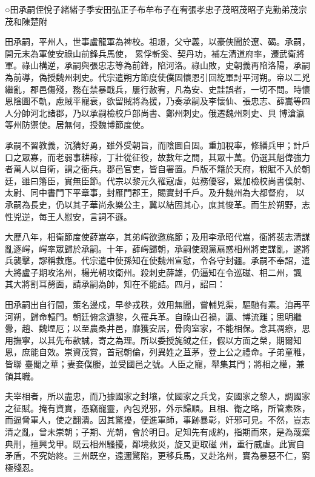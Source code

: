 
\begin{pinyinscope}

 ○田承嗣侄悅子緒緒子季安田弘正子布牟布子在宥張孝忠子茂昭茂昭子克勤弟茂宗茂和陳楚附



 田承嗣，平州人，世事盧龍軍為裨校。祖璟，父守義，以豪俠聞於遼、碣。承嗣，開元末為軍使安祿山前鋒兵馬使，
 累俘斬奚、契丹功，補左清道府率，遷武衛將軍。祿山構逆，承嗣與張忠志等為前鋒，陷河洛。祿山敗，史朝義再陷洛陽，承嗣為前導，偽授魏州刺史。代宗遣朔方節度使僕固懷恩引回紇軍討平河朔。帝以二兇繼亂，郡邑傷殘，務在禁暴戢兵，屢行赦宥，凡為安、史詿誤者，一切不問。時懷恩陰圖不軌，慮賊平寵衰，欲留賊將為援，乃奏承嗣及李懷仙、張忠志、薛嵩等四人分帥河北諸郡，乃以承嗣檢校戶部尚書、鄭州刺史。俄遷魏州刺史、貝
 博滄瀛等州防禦使。居無何，授魏博節度使。



 承嗣不習教義，沉猜好勇，雖外受朝旨，而陰圖自固。重加稅率，修繕兵甲；計戶口之眾寡，而老弱事耕稼，丁壯從征役，故數年之間，其眾十萬。仍選其魁偉強力者萬人以自衛，謂之衙兵。郡邑官吏，皆自署置。戶版不籍於天府，稅賦不入於朝廷，雖曰籓臣，實無臣節。代宗以黎元久罹寇虐，姑務優容，累加檢校尚書僕射、太尉、同中書門下平章事，封雁門郡王，賜實封千戶。及升魏州為大都督府，
 以承嗣為長史，仍以其子華尚永樂公主，冀以結固其心，庶其悛革。而生於朔野，志性兇逆，每王人慰安，言詞不遜。



 大歷八年，相衛節度使薛嵩卒，其弟崿欲邀旄節；及用李承昭代嵩，衙將裴志清謀亂逐崿，崿率眾歸於承嗣。十年，薛崿歸朝，承嗣使親黨扇惑相州將吏謀亂，遂將兵襲擊，謬稱救應。代宗遣中使孫知在使魏州宣慰，令各守封疆。承嗣不奉詔，遣大將盧子期攻洺州，楊光朝攻衛州。殺刺史薛雄，仍逼知在令巡磁、相二州，諷
 其大將割耳剺面，請承嗣為帥，知在不能詰。四月，詔曰：



 田承嗣出自行間，策名邊戍，早參戎秩，效用無聞，嘗輔兇渠，驅馳有素。洎再平河朔，歸命轅門。朝廷俯念遺黎，久罹兵革。自祿山召禍，瀛、博流離；思明繼釁，趙、魏堙厄；以至農桑井邑，靡獲安居，骨肉室家，不能相保。念其凋瘵，思用撫寧，以其先布款誠，寄之為理。所以委授旄鉞之任，假以方面之榮，期爾知恩，庶能自效。崇資茂賞，首冠朝倫，列異姓之苴茅，登上公之禮命。子弟童稚，皆聯
 臺閣之華；妻妾僕媵，並受國邑之號。人臣之寵，舉集其門；將相之權，兼領其職。



 夫宰相者，所以盡忠，而乃據國家之封壤，仗國家之兵戈，安國家之黎人，調國家之征賦。掩有資實，憑竊寵靈，內包兇邪，外示歸順。且相、衛之略，所管素殊，而逼脅軍人，使之翻潰。因其驚擾，便進軍師，事跡暴彰，奸邪可見。不然，豈志清之亂，曾未崇朝；子期、光朝，會於明日。足知先有成約，指期而來，是為蔑棄典刑，擅興戈甲。既云相州騷擾，鄰境救災，旋又更取磁
 州，重行威虐。此實自矛盾，不究始終。三州既空，遠邇驚陷，更移兵馬，又赴洺州，實為暴惡不仁，窮極殘忍。




\end{pinyinscope}
